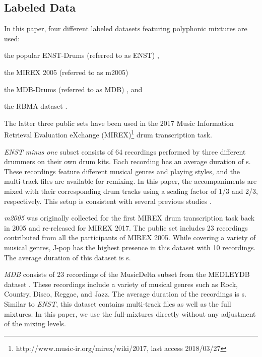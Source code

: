 \documentclass{article}
\newcommand{\comment}[1]{{\textcolor{blue}{#1}}}
\begin{document}
\subsection{Labeled Data}
In this paper, four different labeled datasets featuring polyphonic mixtures are used:
\begin{inparaenum}[(i)]
    \item   the popular ENST-Drums (referred to as ENST) \cite{Gillet2006_enst},
    \item   the MIREX 2005 (referred to as m2005)%
    \item   the MDB-Drums (referred to as MDB) \cite{Southall2017_mdb}, and
    \item   the RBMA dataset \cite{Vogl2017_ismir}.
\end{inparaenum}
The latter three public sets have been used in the 2017 Music Information Retrieval Evaluation eXchange (MIREX)\footnote{http://www.music-ir.org/mirex/wiki/2017, last access 2018/03/27} drum transcription task. 

\textit{ENST} \textit{minus one} subset consists of 64 recordings performed by three different drummers on their own drum kits. Each recording has an average duration of \unit[55]{s}. These recordings feature different musical genres and playing styles, and the multi-track files are available for remixing. In this paper, the accompaniments are mixed with their corresponding drum tracks using a scaling factor of 1/3 and 2/3, respectively. This setup is consistent with several previous studies \cite{Wu2015_ismir, Vogl2016, Southall2016}. 

\textit{m2005} was originally collected for the first MIREX drum transcription task back in 2005 and re-released for MIREX 2017. The public set includes 23 recordings contributed from all the participants of MIREX 2005. While covering a variety of musical genres, J-pop has the highest presence in this dataset with 10 recordings. The average duration of this dataset is \unit[125]{s}. 

\textit{MDB} consists of 23 recordings of the MusicDelta subset from the MEDLEYDB dataset \cite{Bittner2014a}. These recordings include a variety of musical genres such as Rock, Country, Disco, Reggae, and Jazz. The average duration of the recordings is \unit[54]{s}. Similar to \textit{ENST}, this dataset contains multi-track files as well as the full mixtures. In this paper, we use the full-mixtures directly without any adjustment of the mixing levels. 
\end{document}
